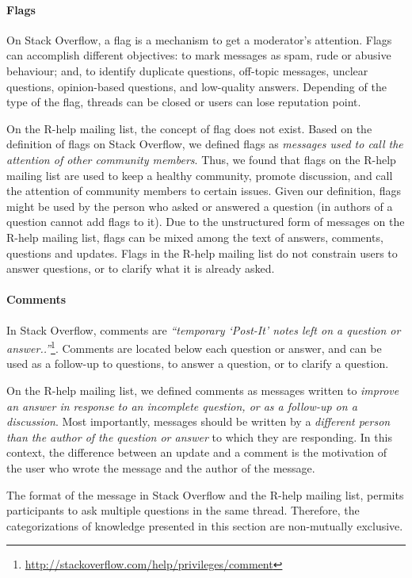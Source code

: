 \paragraph*{Flags}

	On Stack Overflow, a flag is a mechanism to get a moderator's attention.
	Flags can accomplish different objectives: to mark messages as spam, rude or abusive behaviour; and, to identify duplicate questions, off-topic messages, unclear questions, opinion-based questions, and low-quality answers.
	Depending of the type of the flag, threads can be closed or users can lose reputation point.
    
    On the R-help mailing list, the concept of flag does not exist. 
    Based on the definition of flags on Stack Overflow, we defined flags as \emph{messages used to call the attention of other community members}.
    Thus, we found that flags on the R-help mailing list are used to keep a healthy community, promote discussion, and call the attention of community members to certain issues.
    Given our definition, flags might be used by the person who asked or answered a question (in \SO authors of a question cannot add flags to it).
    Due to the unstructured form of messages on the R-help mailing list, flags can be mixed among the text of answers, comments, questions and updates.
	Flags in the R-help mailing list do not constrain users to answer questions, or to clarify what it is already asked.

\paragraph*{Comments}
In Stack Overflow, comments are \textit{``temporary `Post-It' notes left on a question or answer..''}\footnote{\url{http://stackoverflow.com/help/privileges/comment}}.
	Comments are located below each question or answer, and can be used as a follow-up to questions, to answer a question, or to clarify a question.

	On the R-help mailing list, we defined comments as messages written to \emph{improve an answer in response to an incomplete question, or as a follow-up on a discussion}.
	Most importantly, messages should be written by a \emph{different person than the author of the question or answer} to which they are responding.
	In this context, the difference between an update and a comment is the motivation of the user who wrote the message and the author of the message.

	The format of the message in Stack Overflow and the R-help mailing list, permits participants to ask multiple questions in the same thread.
	Therefore, the categorizations of knowledge presented in this section are non-mutually exclusive.

